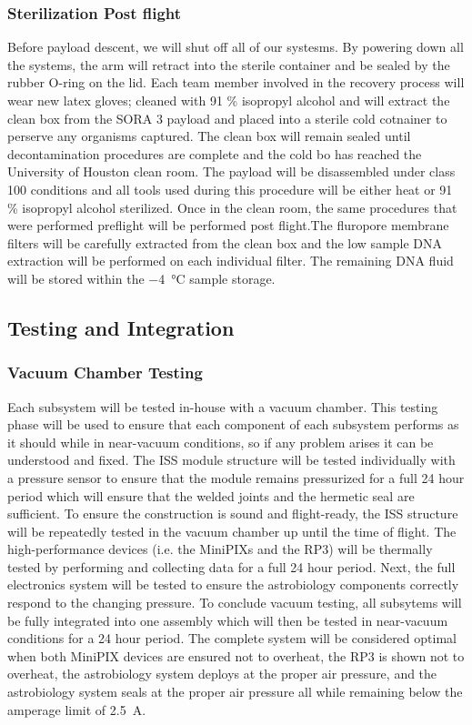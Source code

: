 \subsubsection{Sterilization Post flight}
Before payload descent, we will shut off all of our systesms. By powering down all the systems, the arm will retract into the sterile container and be sealed by the rubber O-ring on the lid. Each team member involved in the recovery process will wear new latex gloves; cleaned with 91 \% isopropyl alcohol and will extract the clean box from the SORA 3 payload and placed into a sterile cold cotnainer to perserve any organisms captured. The clean box will remain sealed until decontamination procedures are complete and the cold bo has reached the University of Houston clean room. The payload will be disassembled under class 100 conditions and all tools used during this procedure will be either heat or 91 \% isopropyl alcohol sterilized. Once in the clean room, the same procedures that were performed preflight will be performed post flight.The fluropore membrane filters will be carefully extracted from the clean box and the low sample DNA extraction will be performed on each individual filter. The remaining DNA fluid will be stored within the \SI{-4}{\celsius} sample storage. 


\subsection{Testing and Integration}

\subsubsection{Vacuum Chamber Testing}
Each subsystem will be tested in-house with a vacuum chamber.
This testing phase will be used to ensure that each component of each subsystem performs as it should while in near-vacuum conditions, so if any problem arises it can be understood and fixed.
The ISS module structure will be tested individually with a pressure sensor to ensure that the module remains pressurized for a full \num{24} hour period which will ensure that the welded joints and the hermetic seal are sufficient.
To ensure the construction is sound and flight-ready, the ISS structure will be repeatedly tested in the vacuum chamber up until the time of flight.
The high-performance devices (i.e. the MiniPIXs and the RP3) will be thermally tested by performing and collecting data for a full \num{24} hour period.
Next, the full electronics system will be tested to ensure the astrobiology components correctly respond to the changing pressure.
To conclude vacuum testing, all subsytems will be fully integrated into one assembly which will then be tested in near-vacuum conditions for a \num{24} hour period.
The complete system will be considered optimal when both MiniPIX devices are ensured not to overheat, the RP3 is shown not to overheat, the astrobiology system deploys at the proper air pressure, and the astrobiology system seals at the proper air pressure all while remaining below the amperage limit of \SI{2.5}{\ampere}.

